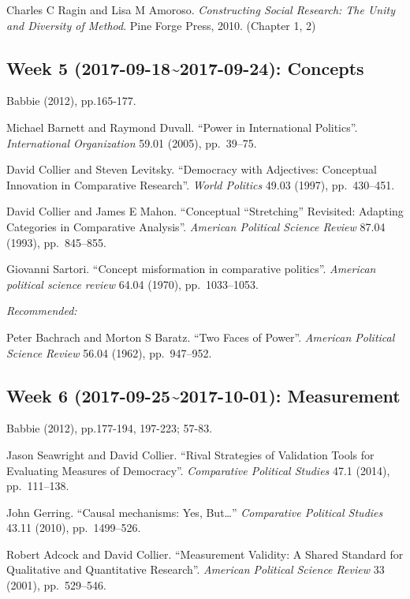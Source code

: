 \documentclass[11pt,]{article}
\begin{document}
Charles C Ragin and Lisa M Amoroso.
\emph{Constructing Social Research: The Unity and Diversity of Method}.
Pine Forge Press, 2010. (Chapter 1, 2)

\subsection{Week 5 (2017-09-18\textasciitilde{}2017-09-24):
Concepts}\label{week-5-2017-09-182017-09-24-concepts}

Babbie (2012), pp.165-177.

Michael Barnett and Raymond Duvall. ``Power in International Politics''.
\emph{International Organization} 59.01 (2005), pp.~39--75.

David Collier and Steven Levitsky. ``Democracy with Adjectives:
Conceptual Innovation in Comparative Research''. \emph{World Politics}
49.03 (1997), pp.~430--451.

David Collier and James E Mahon. ``Conceptual ``Stretching'' Revisited:
Adapting Categories in Comparative Analysis''.
\emph{American Political Science Review} 87.04 (1993), pp.~845--855.

Giovanni Sartori. ``Concept misformation in comparative politics''.
\emph{American political science review} 64.04 (1970), pp.~1033--1053.

\emph{Recommended:}

Peter Bachrach and Morton S Baratz. ``Two Faces of Power''.
\emph{American Political Science Review} 56.04 (1962), pp.~947--952.

\subsection{Week 6 (2017-09-25\textasciitilde{}2017-10-01):
Measurement}\label{week-6-2017-09-252017-10-01-measurement}

Babbie (2012), pp.177-194, 197-223; 57-83.

Jason Seawright and David Collier. ``Rival Strategies of Validation
Tools for Evaluating Measures of Democracy''.
\emph{Comparative Political Studies} 47.1 (2014), pp.~111--138.

John Gerring. ``Causal mechanisms: Yes, But\ldots{}''
\emph{Comparative Political Studies} 43.11 (2010), pp.~1499--526.

Robert Adcock and David Collier. ``Measurement Validity: A Shared
Standard for Qualitative and Quantitative Research''.
\emph{American Political Science Review} 33 (2001), pp.~529--546.
\end{document}
